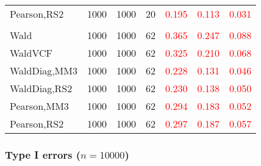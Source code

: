 \documentclass[
]{article}
\begin{document}
\begin{table}[H]
{\begin{tabular}[t]{lrrrrrr}
\hspace{1em}Pearson,RS2 & 1000 & 1000 & 20 & \textcolor{red}{0.195} & \textcolor{red}{0.113} & \textcolor{red}{0.031}\\
\addlinespace[0.3em]
\multicolumn{7}{l}{\textbf{3F 15V}}\\
\hspace{1em}Wald & 1000 & 1000 & 62 & \textcolor{red}{0.365} & \textcolor{red}{0.247} & \textcolor{red}{0.088}\\
\hspace{1em}WaldVCF & 1000 & 1000 & 62 & \textcolor{red}{0.325} & \textcolor{red}{0.210} & \textcolor{red}{0.068}\\
\hspace{1em}WaldDiag,MM3 & 1000 & 1000 & 62 & \textcolor{red}{0.228} & \textcolor{red}{0.131} & \textcolor{red}{0.046}\\
\hspace{1em}WaldDiag,RS2 & 1000 & 1000 & 62 & \textcolor{red}{0.230} & \textcolor{red}{0.138} & \textcolor{red}{0.050}\\
\hspace{1em}Pearson,MM3 & 1000 & 1000 & 62 & \textcolor{red}{0.294} & \textcolor{red}{0.183} & \textcolor{red}{0.052}\\
\hspace{1em}Pearson,RS2 & 1000 & 1000 & 62 & \textcolor{red}{0.297} & \textcolor{red}{0.187} & \textcolor{red}{0.057}\\
\bottomrule
\end{tabular}}
\endgroup{}
\end{table}

\hypertarget{type-i-errors-n10000-1}{%
\subsubsection{\texorpdfstring{Type I errors
(\(n=10000\))}{Type I errors (n=10000)}}\label{type-i-errors-n10000-1}}
\end{document}
